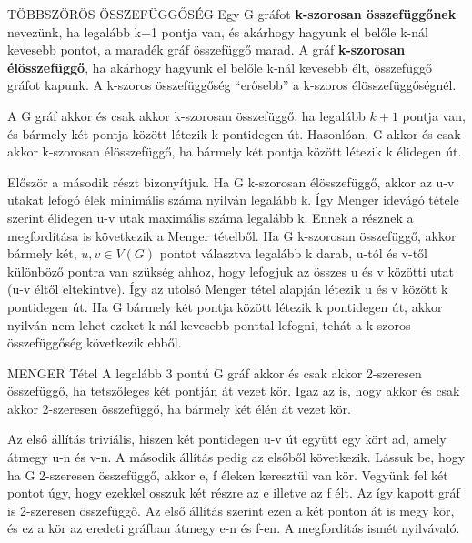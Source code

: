 \begin{definicio}{TÖBBSZÖRÖS ÖSSZEFÜGGŐSÉG}
Egy G gráfot \textbf{k-szorosan összefüggőnek} nevezünk, ha legalább k+1 pontja van, és akárhogy hagyunk el belőle k-nál kevesebb pontot, a maradék gráf összefüggő marad. A gráf \textbf{k-szorosan élösszefüggő}, ha akárhogy hagyunk el belőle k-nál kevesebb élt, összefüggő gráfot kapunk. A k-szoros összefüggőség ``erősebb'' a k-szoros élösszefüggőségnél.
\end{definicio}

\begin{tetel}{A G gráf akkor és csak akkor k-szorosan összefüggő, ha legalább $k + 1$ pontja van, és bármely két pontja között létezik k pontidegen út.}
Hasonlóan, G akkor és csak akkor k-szorosan élösszefüggő, ha bármely két pontja között létezik k élidegen út.
\end{tetel}

\begin{bizonyitas}{}
Először a második részt bizonyítjuk. Ha G k-szorosan élösszefüggő, akkor az u-v utakat lefogó élek minimális száma nyilván legalább k. Így Menger idevágó tétele szerint élidegen u-v utak maximális száma legalább k. Ennek a résznek a megfordítása is következik a Menger tételből. Ha G k-szorosan összefüggő, akkor bármely két, $u,v\in V(G)$ pontot választva legalább k darab, u-tól és v-től különböző pontra van szükség ahhoz, hogy lefogjuk az összes u és v közötti utat (u-v éltől eltekintve). Így az utolsó Menger tétel alapján létezik u és v között k pontidegen út. Ha G bármely két pontja között létezik k pontidegen út, akkor nyilván nem lehet ezeket k-nál kevesebb ponttal lefogni, tehát a k-szoros összefüggőség következik ebből.
\end{bizonyitas}

\begin{tetel}{MENGER Tétel}
A legalább 3 pontú G gráf akkor és csak akkor 2-szeresen összefüggő, ha tetszőleges két pontján át vezet kör. Igaz az is, hogy akkor és csak akkor 2-szeresen összefüggő, ha bármely két élén át vezet kör.
\end{tetel}

\begin{bizonyitas}{}
Az első állítás triviális, hiszen két pontidegen u-v út együtt egy kört ad, amely átmegy u-n és v-n. A második állítás pedig az elsőből következik. Lássuk be, hogy ha G 2-szeresen összefüggő, akkor e, f éleken keresztül van kör. Vegyünk fel két pontot úgy, hogy ezekkel osszuk két részre az e illetve az f élt. Az így kapott gráf is 2-szeresen összefüggő. Az első állítás szerint ezen a két ponton át is megy kör, és ez a kör az eredeti gráfban átmegy e-n és f-en. A megfordítás ismét nyilvávaló.
\end{bizonyitas}
